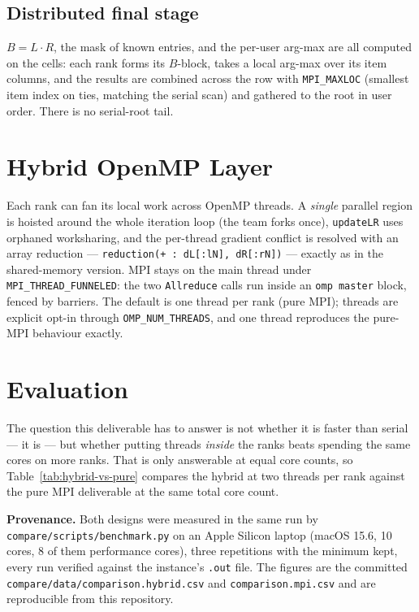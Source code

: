 \documentclass[twocolumn]{article}
\begin{document}
    \subsection{Distributed final stage}\label{subsec:final}
    $B = L \cdot R$, the mask of known entries, and the per-user arg-max are all computed
    on the cells: each rank forms its $B$-block, takes a local arg-max over its item
    columns, and the results are combined across the row with \texttt{MPI\_MAXLOC}
    (smallest item index on ties, matching the serial scan) and gathered to the root in
    user order. There is no serial-root tail.


    \section{Hybrid OpenMP Layer}\label{sec:hybrid}
    Each rank can fan its local work across OpenMP threads. A \emph{single} parallel region
    is hoisted around the whole iteration loop (the team forks once), \texttt{updateLR}
    uses orphaned worksharing, and the per-thread gradient conflict is resolved with an
    array reduction --- \texttt{reduction(+ : dL[:lN], dR[:rN])} --- exactly as in the
    shared-memory version. MPI stays on the main thread under
    \texttt{MPI\_THREAD\_FUNNELED}: the two \texttt{Allreduce} calls run inside an
    \texttt{omp master} block, fenced by barriers. The default is one thread per rank (pure
    MPI); threads are explicit opt-in through \texttt{OMP\_NUM\_THREADS}, and one thread
    reproduces the pure-MPI behaviour exactly.


    \section{Evaluation}\label{sec:evaluation}
    The question this deliverable has to answer is not whether it is faster than serial
    --- it is --- but whether putting threads \emph{inside} the ranks beats spending the
    same cores on more ranks. That is only answerable at equal core counts, so
    Table~\ref{tab:hybrid-vs-pure} compares the hybrid at two threads per rank against the
    pure MPI deliverable at the same total core count.

    \textbf{Provenance.} Both designs were measured in the same run by
    \texttt{compare/scripts/benchmark.py} on an Apple Silicon laptop (macOS 15.6, 10
    cores, 8 of them performance cores), three repetitions with the minimum kept, every
    run verified against the instance's \texttt{.out} file. The figures are the committed
    \texttt{compare/data/comparison.hybrid.csv} and
    \texttt{comparison.mpi.csv} and are reproducible from this repository.
\end{document}
